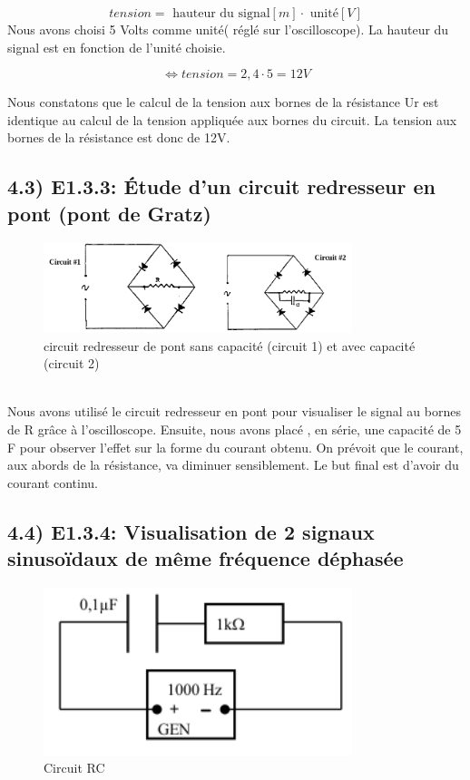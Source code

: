 \documentclass{report}
\begin{document}
\begin{equation}
   tension = \text{ hauteur du signal}[m] \cdot \text{ unit\'e}[V]
\end{equation}
Nous avons choisi 5 Volts comme unit\'e( r\'egl\'e sur l'oscilloscope). La hauteur du signal est en fonction de l'unit\'e choisie.

\begin{equation}
   \Leftrightarrow tension = 2,4 \cdot 5 = 12 V
\end{equation}

Nous constatons que le calcul de la tension aux bornes de la r\'esistance Ur est identique au calcul de la tension appliqu\'ee aux bornes du circuit. La tension aux bornes de la r\'esistance est donc de 12V.

\subsection*{4.3) E1.3.3: \'Etude d'un circuit redresseur en pont (pont de Gratz)}
\hspace*{0.5cm}
\begin{figure}[ht!]
\centering
\includegraphics[width=90mm]{circuitE1.3.3.png}
\caption{circuit redresseur de pont sans capacit\'e (circuit 1) et avec capacit\'e (circuit 2)}
\label{overflow}
\end{figure}
\\

Nous avons utilis\'e le circuit redresseur en pont pour visualiser le signal au bornes de R gr\^ace \`a l'oscilloscope. Ensuite, nous avons plac\'e , en s\'erie, une capacit\'e de 5 \micro F pour observer l'effet sur la forme du courant obtenu. On pr\'evoit que le courant, aux abords de la r\'esistance, va diminuer sensiblement.
Le but final est d'avoir du courant continu.

\subsection*{4.4) E1.3.4: Visualisation de 2 signaux sinusoïdaux de même fréquence déphasée}
\hspace*{0.5cm}
\begin{figure}[ht!]
\centering
\includegraphics[width=90mm]{circuitE1.3.4.png}
\caption{Circuit RC}
\label{overflow}
\end{figure}
\\
\end{document}
